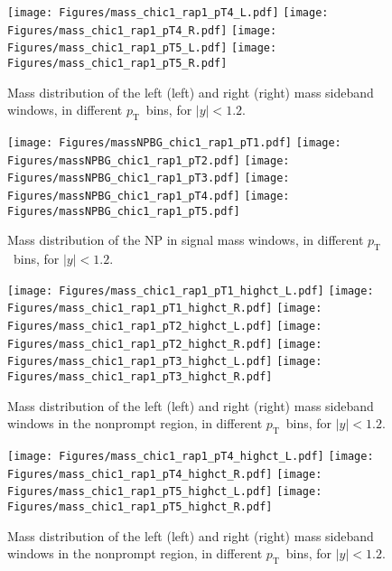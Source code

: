 \documentclass[12pt]{article}
\newcommand{\pt}{$p_{\mathrm{T}}$}
\begin{document}
\begin{figure}[htbp]
\centering
\texttt{[image: Figures/mass\_chic1\_rap1\_pT4\_L.pdf]}
\texttt{[image: Figures/mass\_chic1\_rap1\_pT4\_R.pdf]}
\texttt{[image: Figures/mass\_chic1\_rap1\_pT5\_L.pdf]}
\texttt{[image: Figures/mass\_chic1\_rap1\_pT5\_R.pdf]}
\caption{Mass distribution of the left (left) and
  right (right) mass sideband windows, in different
  \pt\ bins, for $|y| < 1.2$.}
\end{figure}
\clearpage

\begin{figure}[htbp]
\centering
\texttt{[image: Figures/massNPBG\_chic1\_rap1\_pT1.pdf]}
\texttt{[image: Figures/massNPBG\_chic1\_rap1\_pT2.pdf]}
\texttt{[image: Figures/massNPBG\_chic1\_rap1\_pT3.pdf]}
\texttt{[image: Figures/massNPBG\_chic1\_rap1\_pT4.pdf]}
\texttt{[image: Figures/massNPBG\_chic1\_rap1\_pT5.pdf]}
\caption{Mass distribution of the NP in signal mass
  windows, in different \pt\ bins, for $|y| < 1.2$.}
\end{figure}
\clearpage

\begin{figure}[htbp]
\centering
\texttt{[image: Figures/mass\_chic1\_rap1\_pT1\_highct\_L.pdf]}
\texttt{[image: Figures/mass\_chic1\_rap1\_pT1\_highct\_R.pdf]}
\texttt{[image: Figures/mass\_chic1\_rap1\_pT2\_highct\_L.pdf]}
\texttt{[image: Figures/mass\_chic1\_rap1\_pT2\_highct\_R.pdf]}
\texttt{[image: Figures/mass\_chic1\_rap1\_pT3\_highct\_L.pdf]}
\texttt{[image: Figures/mass\_chic1\_rap1\_pT3\_highct\_R.pdf]}
\caption{Mass distribution of the left (left) and
  right (right) mass sideband windows in the nonprompt region, in different
  \pt\ bins, for $|y| < 1.2$.}
\end{figure}
\clearpage

\begin{figure}[htbp]
\centering
\texttt{[image: Figures/mass\_chic1\_rap1\_pT4\_highct\_L.pdf]}
\texttt{[image: Figures/mass\_chic1\_rap1\_pT4\_highct\_R.pdf]}
\texttt{[image: Figures/mass\_chic1\_rap1\_pT5\_highct\_L.pdf]}
\texttt{[image: Figures/mass\_chic1\_rap1\_pT5\_highct\_R.pdf]}
\caption{Mass distribution of the left (left) and
  right (right) mass sideband windows in the nonprompt region, in different
  \pt\ bins, for $|y| < 1.2$.}
\end{figure}
\clearpage
\end{document}

